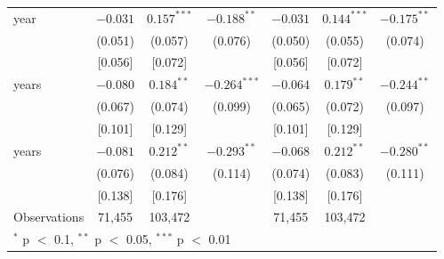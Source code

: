 \begin{tabular}{lcccccc}
\quad 1 year & $-0.031$ & $0.157^{***}$ & $-0.188^{**}$ & $-0.031$ & $0.144^{***}$ & $-0.175^{**}$ \\
 & (0.051) & (0.057) & (0.076) & (0.050) & (0.055) & (0.074) \\
 & [0.056] & [0.072] &  & [0.056] & [0.072] &  \\
\quad 2 years & $-0.080$ & $0.184^{**}$ & $-0.264^{***}$ & $-0.064$ & $0.179^{**}$ & $-0.244^{**}$ \\
 & (0.067) & (0.074) & (0.099) & (0.065) & (0.072) & (0.097) \\
 & [0.101] & [0.129] &  & [0.101] & [0.129] &  \\
\quad 3 years & $-0.081$ & $0.212^{**}$ & $-0.293^{**}$ & $-0.068$ & $0.212^{**}$ & $-0.280^{**}$ \\
 & (0.076) & (0.084) & (0.114) & (0.074) & (0.083) & (0.111) \\
 & [0.138] & [0.176] &  & [0.138] & [0.176] &  \\
\midrule
Observations & 71,455 & 103,472 &  & 71,455 & 103,472 &  \\
\bottomrule
\multicolumn{7}{l}{\footnotesize $^{*}$ p $<$ 0.1, $^{**}$ p $<$ 0.05, $^{***}$ p $<$ 0.01} \\
\end{tabular}
